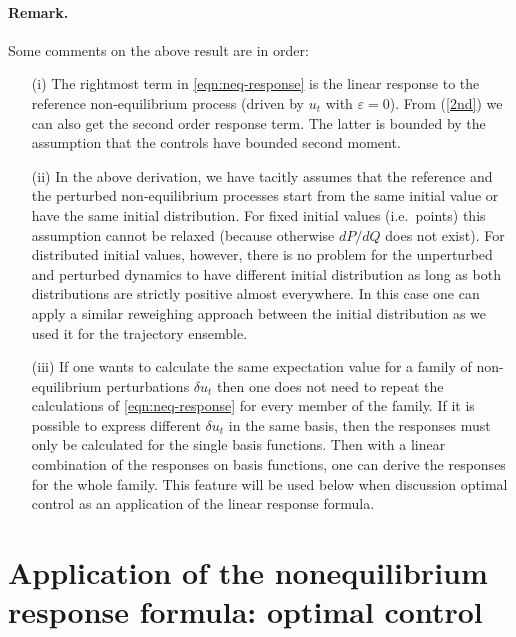 \documentclass[aip,jcp,a4paper,reprint,onecolumn]{revtex4-1}
\newcommand{\eps}{\varepsilon}
\begin{document}
\paragraph*{Remark.} Some comments on the above result are in order:
\begin{itemize}

\item[(i)] The rightmost term in \eqref{eqn:neq-response} is the linear 
  response to the reference non-equilibrium process (driven by $u_t$ with $\eps=0$). From (\ref{2nd}) we can also get the second order response term. The latter is bounded by the assumption that the controls have bounded second moment.  

\item[(ii)] In the above derivation, we have tacitly assumes that the reference and the perturbed non-equilibrium processes start from the same initial value or
  have the same initial distribution. For fixed initial values (i.e.~points) this assumption cannot be relaxed (because otherwise $dP/dQ$ does not exist). For distributed initial values, however, there is no problem for the unperturbed and perturbed dynamics to have different initial distribution as long as both distributions are strictly positive almost everywhere. In this case one can apply a similar reweighing approach between the initial distribution as we used it for the trajectory ensemble.  

\item[(iii)] If one wants to calculate the same expectation value for a family of non-equilibrium perturbations $\delta u_t$ then 
one does not need to repeat the calculations of \eqref{eqn:neq-response} for every member of the family. 
  If it is possible to
  express different $\delta u_t$ in the same basis, then the responses must only be
  calculated for the single basis functions. Then with a linear combination of the responses on basis functions, one can derive
  the responses for the whole family. This feature will be used below when discussion optimal control as an application of the linear response formula. 
  

\end{itemize}





\section{Application of the nonequilibrium response formula: optimal control}
\end{document}
